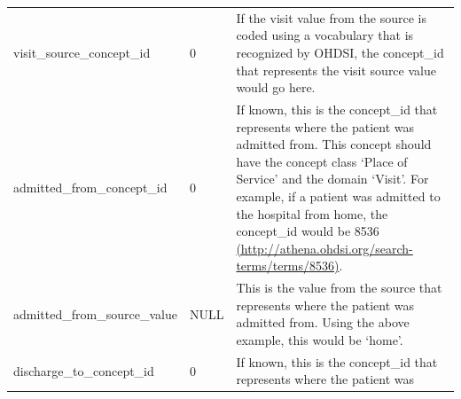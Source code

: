 \documentclass[]{book}
\begin{document}
\begin{longtable}[]{@{}lll@{}}
\begin{minipage}[t]{0.25\columnwidth}
visit\_source\_concept\_id\strut
\end{minipage} & \begin{minipage}[t]{0.17\columnwidth}\raggedright\strut
0\strut
\end{minipage} & \begin{minipage}[t]{0.49\columnwidth}\raggedright\strut
If the visit value from the source is coded using a vocabulary that is
recognized by OHDSI, the concept\_id that represents the visit source
value would go here.\strut
\end{minipage}\tabularnewline
\begin{minipage}[t]{0.25\columnwidth}\raggedright\strut
admitted\_from\_concept\_id\strut
\end{minipage} & \begin{minipage}[t]{0.17\columnwidth}\raggedright\strut
0\strut
\end{minipage} & \begin{minipage}[t]{0.49\columnwidth}\raggedright\strut
If known, this is the concept\_id that represents where the patient was
admitted from. This concept should have the concept class `Place of
Service' and the domain `Visit'. For example, if a patient was admitted
to the hospital from home, the concept\_id would be 8536
\href{http://athena.ohdsi.org/search-terms/terms/8536}{(http://athena.ohdsi.org/search-terms/terms/8536)}.\strut
\end{minipage}\tabularnewline
\begin{minipage}[t]{0.25\columnwidth}\raggedright\strut
admitted\_from\_source\_value\strut
\end{minipage} & \begin{minipage}[t]{0.17\columnwidth}\raggedright\strut
NULL\strut
\end{minipage} & \begin{minipage}[t]{0.49\columnwidth}\raggedright\strut
This is the value from the source that represents where the patient was
admitted from. Using the above example, this would be `home'.\strut
\end{minipage}\tabularnewline
\begin{minipage}[t]{0.25\columnwidth}\raggedright\strut
discharge\_to\_concept\_id\strut
\end{minipage} & \begin{minipage}[t]{0.17\columnwidth}\raggedright\strut
0\strut
\end{minipage} & \begin{minipage}[t]{0.49\columnwidth}\raggedright\strut
If known, this is the concept\_id that represents where the patient was

\end{minipage}
\end{longtable}
\end{document}
